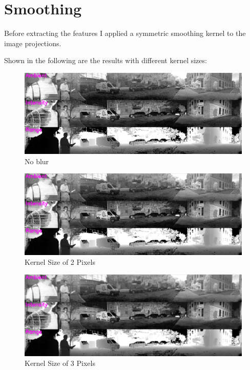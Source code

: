 \chapter{Smoothing}\label{ch:smoothing}

Before extracting the features I applied a symmetric smoothing kernel to the image projections. 

Shown in the following are the results with different kernel sizes:

\begin{figure}[ht]
    \centering
    \includegraphics[scale = 0.19]{images/smoothing/no_blur.png}
    \caption{No blur}
\end{figure}

\begin{figure}[ht]
    \centering
    \includegraphics[scale = 0.19]{images/smoothing/2blur.png}
    \caption{Kernel Size of 2 Pixels}
\end{figure}

\clearpage

\begin{figure}[ht]
    \centering
    \includegraphics[scale = 0.19]{images/smoothing/3blur.png}
    \caption{Kernel Size of 3 Pixels}
\end{figure}

